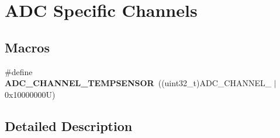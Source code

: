 \hypertarget{group___a_d_c_ex__channels}{}\section{A\+DC Specific Channels}
\label{group___a_d_c_ex__channels}
\subsection*{Macros}
\begin{DoxyCompactItemize}
\item 
\mbox{\label{group___a_d_c_ex__channels_ga8f0da1e8fa8504c92a368f6eb8e229b3}} 
\#define {\bfseries A\+D\+C\+\_\+\+C\+H\+A\+N\+N\+E\+L\+\_\+\+T\+E\+M\+P\+S\+E\+N\+S\+OR}~((uint32\+\_\+t)A\+D\+C\+\_\+\+C\+H\+A\+N\+N\+E\+L\+\_ $\vert$ 0x10000000\+U)
\end{DoxyCompactItemize}


\subsection{Detailed Description}
